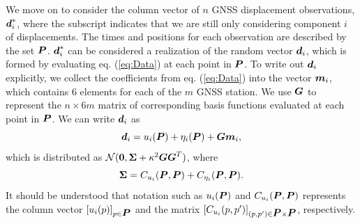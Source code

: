 \documentclass[extra,mreferee]{gji}
\begin{document}
We move on to consider the column vector of $n$ GNSS displacement observations, $\mitbf{d}^*_i$, where the subscript indicates that we are still only considering component $i$ of displacements. The times and positions for each observation are described by the set $\mitbf{P}$. $\mitbf{d}^*_i$ can be considered a realization of the random vector $\mitbf{d}_i$, which is formed by evaluating eq. (\ref{eq:Data}) at each point in $\mitbf{P}$. To write out $\mitbf{d}_i$ explicitly, we collect the coefficients from eq. (\ref{eq:Data}) into the vector $\mitbf{m}_i$, which contains 6 elements for each of the $m$ GNSS station. We use $\mitbf{G}$ to represent the $n \times 6m$ matrix of corresponding basis functions evaluated at each point in $\mitbf{P}$. We can write $\mitbf{d}_i$ as 
\begin{equation}\label{eq:DataVec}
\mitbf{d}_i = u_i(\mitbf{P}) + \eta_i(\mitbf{P}) + \mitbf{G}\mitbf{m}_i,
\end{equation}
which is distributed as $\mathcal{N}(\mitbf{0},\mitbf{\Sigma} + \kappa^2\mitbf{G}\mitbf{G}^T)$, where
\begin{equation}\label{eq:Cd}
\mitbf{\Sigma} = C_{u_i}(\mitbf{P},\mitbf{P}) + C_{\eta_i}(\mitbf{P},\mitbf{P}).  
\end{equation}
It should be understood that notation such as $u_i(\mitbf{P})$ and $C_{u_i}(\mitbf{P},\mitbf{P})$ represents the column vector $[u_i(p)]_{p \in \mitbf{P}}$ and the matrix $[C_{u_i}(p,p')]_{(p,p') \in \mitbf{P} \times \mitbf{P}}$, respectively. 
\end{document}
